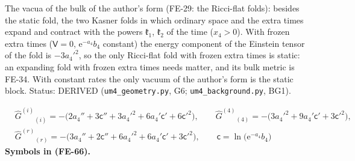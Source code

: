 \documentclass[
  10pt,
]{article}
\begin{document}
The vacua of the bulk of the author's form (FE-29: the Ricci-flat
folds): besides the static fold, the two Kasner folds in which ordinary
space and the extra times expand and contract with the powers
\(\mathfrak{k}_1\), \(\mathfrak{k}_2\) of the time (\(x_4 > 0\)). With
frozen extra times (\(\mathsf{V} = 0\), \(\mathrm{e}^{-a_4}b_4\)
constant) the energy component of the Einstein tensor of the fold is
\(-3a_4'^2\), so the only Ricci-flat fold with frozen extra times is
static: an expanding fold with frozen extra times needs matter, and its
bulk metric is FE-34. With constant rates the only vacuum of the
author's form is the static block. Status: DERIVED
(\texttt{um4\_geometry.py}, G6; \texttt{um4\_background.py}, BG1).

\[
\begin{aligned}
&\hat G^{(i)}{}_{(i)} = -\big(2a_4'' + 3\mathsf{c}'' + 3a_4'^2 + 6a_4'\mathsf{c}' + 6\mathsf{c}'^2\big),\qquad
 \hat G^{(4)}{}_{(4)} = -\big(3a_4'^2 + 9a_4'\mathsf{c}' + 3\mathsf{c}'^2\big),\\
&\hat G^{(r)}{}_{(r)} = -\big(3a_4'' + 2\mathsf{c}'' + 6a_4'^2 + 6a_4'\mathsf{c}' + 3\mathsf{c}'^2\big),\qquad
 \mathsf{c} = \ln\big(\mathrm{e}^{-a_4}b_4\big)
\end{aligned} \tag{FE-66}
\] \textbf{Symbols in (FE-66).}
\end{document}
